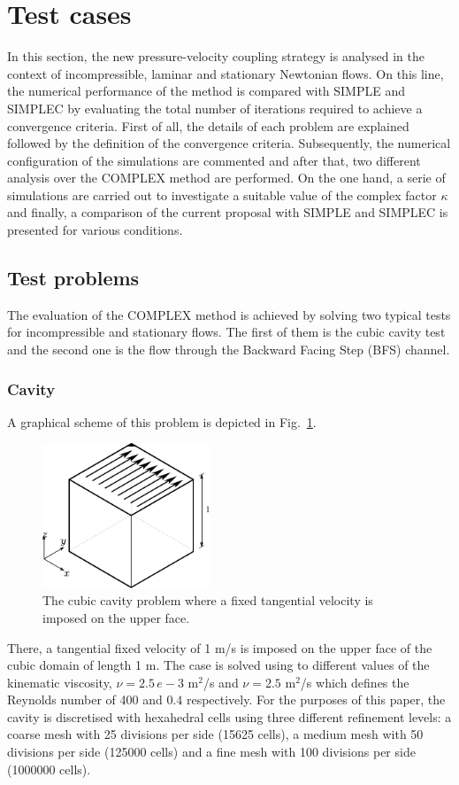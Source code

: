 \documentclass[final,3p,times,11pt,onecolumn]{myElsarticle}
\numberwithin{equation}{section}
\begin{document}
\section{Test cases}
\label{sec:cases}

In this section, the new pressure-velocity coupling strategy is analysed in the context of incompressible, laminar and stationary Newtonian flows. On this line, the numerical performance of the method is compared with  SIMPLE and SIMPLEC by evaluating the total number of iterations required to achieve a convergence criteria. First of all, the details of each problem are explained followed by the definition of the convergence criteria. Subsequently, the numerical configuration of the simulations are commented and after that, two different analysis over the COMPLEX method are performed. On the one hand, a serie of simulations are carried out to investigate a suitable value of the complex factor $\kappa$ and finally, a comparison of the current proposal with SIMPLE and SIMPLEC is presented for various conditions. 

\subsection{Test problems}\label{Section:problemDescription}
 The evaluation of the COMPLEX method is achieved by solving two typical tests for incompressible and stationary flows. The first of them is the cubic cavity test and the second one is the flow through the Backward Facing Step (BFS) channel.
\subsubsection{Cavity}
 A graphical scheme of this problem is depicted in Fig.~\ref{Fig:Cavity}.
\begin{figure}[t!!!]
\centering
\includegraphics[width=5cm]{fig/Cases/Cavity.pdf}
\caption{The cubic cavity problem where a fixed tangential velocity is imposed on the upper face.}
\label{Fig:Cavity}
\end{figure} 
There, a tangential fixed velocity of 1 m/s is imposed on the upper face of the cubic domain of length 1 m. The case is solved using to different values of the kinematic viscosity, $\nu = 2.5\, e-3$ m$^2$/s and $\nu = 2.5$ m$^2$/s which defines the Reynolds number of 400 and $0.4$ respectively. For the purposes of this paper, the cavity is discretised with hexahedral cells using three different refinement levels: a coarse mesh with 25 divisions per side (15625 cells), a medium mesh with 50 divisions per side (125000 cells) and a fine mesh with 100 divisions per side (1000000 cells).
\end{document}
